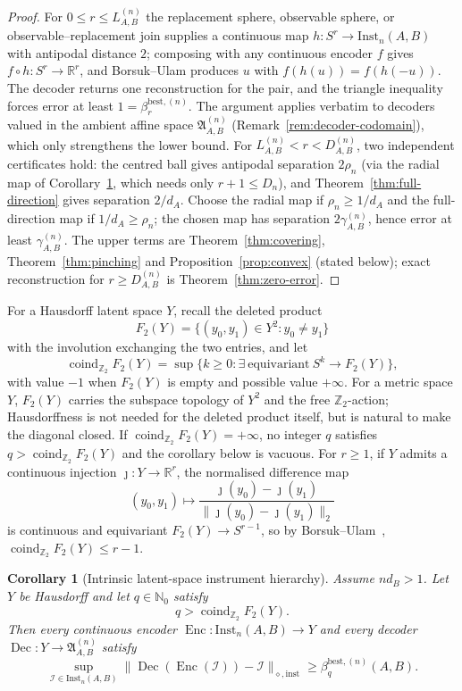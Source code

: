 \documentclass[11pt,a4paper]{article}
\newtheorem{corollary}[theorem]{Corollary}
\newcommand{\Inst}{\mathrm{Inst}}
\newcommand{\coind}{\operatorname{coind}_{\mathbb Z_2}}
\begin{document}
\begin{proof}
For $0\le r\le L_{A,B}^{(n)}$ the replacement sphere, observable sphere, or observable--replacement join supplies a continuous map $h:S^r\to\Inst_n(A,B)$ with antipodal distance $2$; composing with any continuous encoder $f$ gives $f\circ h:S^r\to\mathbb R^r$, and Borsuk--Ulam produces $u$ with $f(h(u))=f(h(-u))$. The decoder returns one reconstruction for the pair, and the triangle inequality forces error at least $1=\beta_r^{\mathrm{best},(n)}$. The argument applies verbatim to decoders valued in the ambient affine space $\mathfrak A_{A,B}^{(n)}$ (Remark~\ref{rem:decoder-codomain}), which only strengthens the lower bound. For $L_{A,B}^{(n)}<r<D_{A,B}^{(n)}$, two independent certificates hold: the centred ball gives antipodal separation $2\rho_n$ (via the radial map of Corollary~\ref{cor:intrinsic}, which needs only $r+1\le D_n$), and Theorem~\ref{thm:full-direction} gives separation $2/d_A$. Choose the radial map if $\rho_n\ge1/d_A$ and the full-direction map if $1/d_A\ge\rho_n$; the chosen map has separation $2\gamma_{A,B}^{(n)}$, hence error at least $\gamma_{A,B}^{(n)}$. The upper terms are Theorem~\ref{thm:covering}, Theorem~\ref{thm:pinching} and Proposition~\ref{prop:convex} (stated below); exact reconstruction for $r\ge D_{A,B}^{(n)}$ is Theorem~\ref{thm:zero-error}.
\end{proof}

For a Hausdorff latent space $Y$, recall the deleted product
\[
F_2(Y)=\{(y_0,y_1)\in Y^2:y_0\neq y_1\}
\]
with the involution exchanging the two entries, and let
\[
\coind F_2(Y)
=\sup\big\{k\ge0:\exists\ \text{equivariant}\ S^k\to F_2(Y)\big\},
\]
with value $-1$ when $F_2(Y)$ is empty and possible value $+\infty$. For a metric space $Y$, $F_2(Y)$ carries the subspace topology of $Y^2$ and the free $\mathbb Z_2$-action; Hausdorffness is not needed for the deleted product itself, but is natural to make the diagonal closed. If $\coind F_2(Y)=+\infty$, no integer $q$ satisfies $q>\coind F_2(Y)$ and the corollary below is vacuous. For $r\ge1$, if $Y$ admits a continuous injection $\jmath:Y\to\mathbb R^r$, the normalised difference map
\[
(y_0,y_1)\longmapsto\frac{\jmath(y_0)-\jmath(y_1)}{\|\jmath(y_0)-\jmath(y_1)\|_2}
\]
is continuous and equivariant $F_2(Y)\to S^{r-1}$, so by Borsuk--Ulam~\cite{Matousek2003}, $\coind F_2(Y)\le r-1$.

\begin{corollary}[Intrinsic latent-space instrument hierarchy]
\label{cor:intrinsic}
Assume $nd_B>1$. Let $Y$ be Hausdorff and let $q\in\mathbb N_0$ satisfy
\[
q>\coind F_2(Y).
\]
Then every continuous encoder $\operatorname{Enc}:\Inst_n(A,B)\to Y$ and every decoder $\operatorname{Dec}:Y\to\mathfrak A_{A,B}^{(n)}$ satisfy
\[
\sup_{\mathcal I\in\Inst_n(A,B)}
\|\operatorname{Dec}(\operatorname{Enc}(\mathcal I))-\mathcal I\|_{\diamond,\mathrm{inst}}
\ge\beta_q^{\mathrm{best},(n)}(A,B).
\]
\end{corollary}
\end{document}
